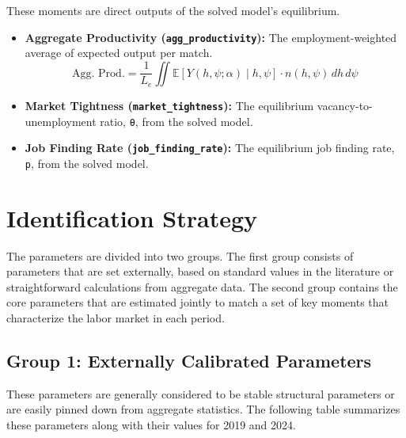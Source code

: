 \documentclass[
  11pt,
  letterpaper,
  DIV=11,
  numbers=noendperiod]{scrartcl}
\begin{document}
These moments are direct outputs of the solved model's equilibrium.

\begin{itemize}
\item
  \textbf{Aggregate Productivity (\texttt{agg\_productivity}):} The
  employment-weighted average of expected output per match.
  \[ \text{Agg. Prod.} = \frac{1}{L_e} \iint \mathbb{E}[Y(h, \psi; \alpha) \mid h, \psi] \cdot n(h, \psi) \,dh \,d\psi \]
\item
  \textbf{Market Tightness (\texttt{market\_tightness}):} The
  equilibrium vacancy-to-unemployment ratio, \texttt{θ}, from the solved
  model.
\item
  \textbf{Job Finding Rate (\texttt{job\_finding\_rate}):} The
  equilibrium job finding rate, \texttt{p}, from the solved model.
\end{itemize}

\section{Identification Strategy}\label{identification-strategy}

The parameters are divided into two groups. The first group consists of
parameters that are set externally, based on standard values in the
literature or straightforward calculations from aggregate data. The
second group contains the core parameters that are estimated jointly to
match a set of key moments that characterize the labor market in each
period.

\subsection{\texorpdfstring{\textbf{Group 1: Externally Calibrated
Parameters}}{Group 1: Externally Calibrated Parameters}}\label{group-1-externally-calibrated-parameters}

These parameters are generally considered to be stable structural
parameters or are easily pinned down from aggregate statistics. The
following table summarizes these parameters along with their values for
2019 and 2024.
\end{document}
